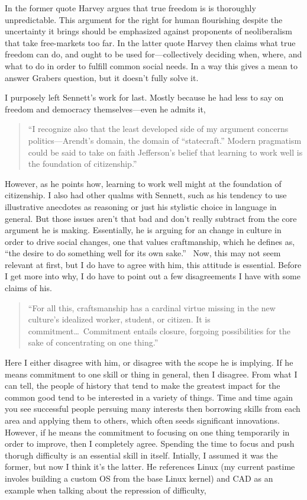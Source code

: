 \documentclass[12pt,a4paper]{article}
\begin{document}
In the former quote Harvey argues that true freedom is is thoroughly unpredictable. This argument for the right for human flourishing despite the uncertainty it brings should be emphasized against proponents of neoliberalism that take free-markets too far. In the latter quote Harvey then claims what true freedom can do, and ought to be used for---collectively deciding when, where, and what to do in order to fulfill common social needs. In a way this gives a mean to answer Grabers question, but it doesn't fully solve it. 

I purposely left Sennett's work for last. Mostly because he had less to say on freedom and democracy themselves---even he admits it,
\begin{quote}\color{G-Moon}
``I recognize also that the least developed side of my argument concerns politics—Arendt’s domain, the domain of ``statecraft.'' Modern
pragmatism could be said to take on faith Jefferson’s belief that learning to work well is the foundation of citizenship.''~\cite{craft}
\end{quote}
However, as he points how, learning to work well might at the foundation of citizenship. I also had other qualms with Sennett, such as his tendency to use illustrative anecdotes as reasoning or just his stylistic choice in language in general. But those issues aren't that bad and don't really subtract from the core argument he is making. Essentially, he is arguing for an change in culture in order to drive social changes, one that values craftmanship, which he defines as, ``the desire to do something well for its own sake.''~\cite{craft} Now, this may not seem relevant at first, but I do have to agree with him, this attitude is essential. Before I get more into why, I do have to point out a few disagreements I have with some claims of his.
\begin{quote}\color{G-Moon}
   ``For all this, craftsmanship has a cardinal virtue missing in the new culture’s idealized worker, student, or citizen. It is commitment\ldots~Commitment entails closure, forgoing possibilities for the sake of concentrating on one thing.''~\cite{craft}
\end{quote}
Here I either disagree with him, or disagree with the scope he is implying. If he means commitment to one skill or thing in general, then I disagree. From what I can tell, the people of history that tend to make the greatest impact for the common good tend to be interested in a variety of things. Time and time again you see successful people persuing many interests then borrowing skills from each area and applying them to others, which often seeds significant innovations. However, if he means the commitment to focusing on one thing temporarily in order to improve, then I completely agree. Spending the time to focus and push thorugh difficulty is an essential skill in itself. Intially, I assumed it was the former, but now I think it's the latter. He references Linux (my current pastime involes building a custom OS from the base Linux kernel) and CAD as an example when talking about the repression of difficulty,
\end{document}
